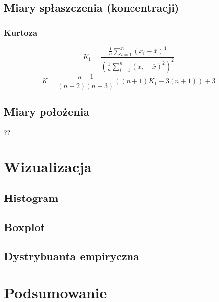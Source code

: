 \documentclass{article}
\theoremstyle{break}
\begin{document}
\subsection{Miary spłaszczenia (koncentracji)}
\subsubsection{Kurtoza}
$$K_1 =\frac{\frac{1}{n}\sum\limits_{i=1}^{n}(x_i-\overline{x})^4}{(\frac{1}{n}\sum\limits_{i=1}^{n}(x_i-\overline{x})^2)^2}$$
$$K=\frac{n-1}{(n-2)(n-3)}((n+1)K_1-3(n+1))+3$$

\subsection{Miary położenia}
??

\section{Wizualizacja}
\subsection{Histogram}
\subsection{Boxplot}
\subsection{Dystrybuanta empiryczna}

\section{Podsumowanie}
\end{document}
